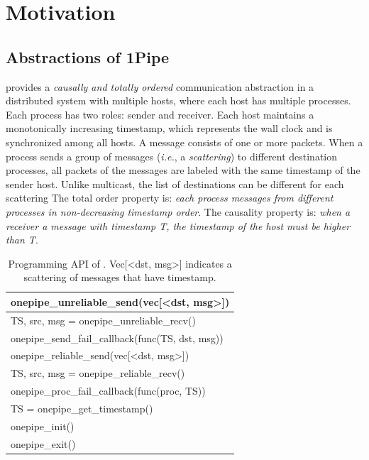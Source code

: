 \section{Motivation}
\label{sec:motivation}

\subsection{Abstractions of 1Pipe}
\label{subsec:abstration}

\sys{} provides a \emph{causally and totally ordered} communication abstraction in a distributed system with multiple hosts, where each host has multiple processes. Each process has two roles: sender and receiver. Each host maintains a monotonically increasing timestamp, which represents the wall clock and is synchronized among all hosts. A message consists of one or more packets. When a process sends a group of messages (\emph{i.e.}, a \emph{scattering}) to different destination processes, all packets of the messages are labeled with the same timestamp of the sender host. Unlike multicast, the list of destinations can be different for each scattering The total order property is: \emph{each process  messages from different processes in non-decreasing timestamp order}. The causality property is: \emph{when a receiver  a message with timestamp T, the timestamp of the host must be higher than T}.

\begin{table}[htbp]
\centering
\begin{tabular}{l}
	\hline
	onepipe\_unreliable\_send(vec[<dst, msg>]) \\
	\hline
	TS, src, msg = onepipe\_unreliable\_recv() \\
	\hline
	onepipe\_send\_fail\_callback(func(TS, dst, msg)) \\
	\hline
	\hline
	onepipe\_reliable\_send(vec[<dst, msg>]) \\
	\hline
	TS, src, msg = onepipe\_reliable\_recv() \\
	\hline
	onepipe\_proc\_fail\_callback(func(proc, TS)) \\
	\hline
	\hline
	TS = onepipe\_get\_timestamp() \\
	\hline
	onepipe\_init() \\
	\hline
	onepipe\_exit() \\
	\hline
\end{tabular}
\caption{Programming API of \sys{}. Vec[<dst, msg>] indicates a scattering of messages that have  timestamp.}
\label{tab:abstraction}
\end{table}

